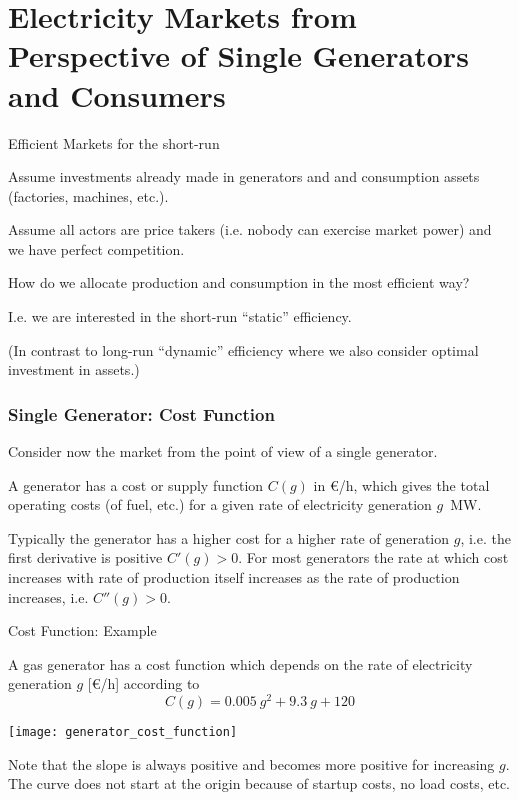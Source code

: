 \documentclass[10pt,aspectratio=169,dvipsnames]{beamer}
\begin{document}
\section{Electricity Markets from Perspective of Single Generators and Consumers}

\begin{frame}{Efficient Markets for the short-run}


  Assume investments already made in generators and and consumption assets (factories, machines, etc.).

  Assume all actors are price takers (i.e. nobody can exercise market power) and we have perfect competition.

  How do we allocate production and consumption in the most efficient way?


  I.e. we are interested in the \alert{short-run ``static'' efficiency}.

  \vspace{.7cm}

  (In contrast to \alert{long-run ``dynamic'' efficiency} where we also consider optimal investment in assets.)
\end{frame}





\begin{frame}
  \frametitle{Single Generator: Cost Function}

  Consider now the market from the point of view of a single generator.

  A generator has a \alert{cost or supply function} $C(g)$ in \euro/h,
  which gives the total operating costs (of fuel, etc.) for a given
  rate of electricity generation $g$~MW.

  Typically the generator has a higher cost for a higher rate of generation $g$,
  i.e. the first derivative is positive $C'(g) > 0$. For most generators the rate at which cost increases with rate of production itself increases as the rate of production increases, i.e. $C''(g) > 0$.

\end{frame}


\begin{frame}{Cost Function: Example}


  A gas generator has a cost function which depends on the
  rate of electricity generation $g$ [\euro/h] according to
  \begin{equation*}
    C(g) = 0.005~g^2  + 9.3~g + 120
  \end{equation*}


  \centering
  \texttt{[image: generator\_cost\_function]}

  \raggedright
  Note that the slope is always positive and becomes more positive
  for increasing $g$. The curve does not start at the origin because of startup costs, no load costs, etc.
\end{frame}
\end{document}
